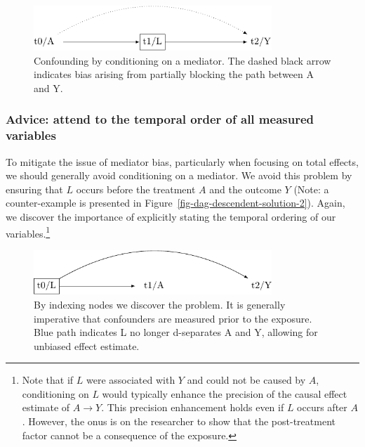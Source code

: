 \documentclass[
  singlecolumn]{article}
\begin{document}
\begin{figure}

{\centering \includegraphics[width=0.8\textwidth,height=\textheight]{causal-dags_files/figure-pdf/fig-dag-mediator-1.pdf}

}

\caption{\label{fig-dag-mediator}Confounding by conditioning on a
mediator. The dashed black arrow indicates bias arising from partially
blocking the path between A and Y.}

\end{figure}

\hypertarget{advice-attend-to-the-temporal-order-of-all-measured-variables-2}{%
\subsubsection{Advice: attend to the temporal order of all measured
variables}\label{advice-attend-to-the-temporal-order-of-all-measured-variables-2}}

To mitigate the issue of mediator bias, particularly when focusing on
total effects, we should generally avoid conditioning on a mediator. We
avoid this problem by ensuring that \(L\) occurs before the treatment
\(A\) and the outcome \(Y\) (Note: a counter-example is presented in
Figure~\ref{fig-dag-descendent-solution-2}). Again, we discover the
importance of explicitly stating the temporal ordering of our
variables.\footnote{Note that if \(L\) were associated with \(Y\) and
  could not be caused by \(A\), conditioning on \(L\) would typically
  enhance the precision of the causal effect estimate of \(A \to Y\).
  This precision enhancement holds even if \(L\) occurs after \(A\).
  However, the onus is on the researcher to show that the post-treatment
  factor cannot be a consequence of the exposure.}

\begin{figure}

{\centering \includegraphics[width=0.8\textwidth,height=\textheight]{causal-dags_files/figure-pdf/fig-dag-mediator-solution-1.pdf}

}

\caption{\label{fig-dag-mediator-solution}By indexing nodes we discover
the problem. It is generally imperative that confounders are measured
prior to the exposure. Blue path indicates L no longer d-separates A and
Y, allowing for unbiased effect estimate.}

\end{figure}
\end{document}
